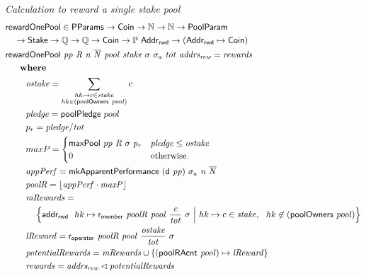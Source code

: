 \begin{figure}[htb]
  \emph{Calculation to reward a single stake pool}
  \begin{align*}
    & \mathsf{rewardOnePool} \in \mathsf{PParams} \to \mathsf{Coin} \to \mathbb{N} \to \mathbb{N} \to \mathsf{PoolParam}\\
      & ~~~\to \mathsf{Stake} \to \mathbb{Q} \to \mathbb{Q} \to \mathsf{Coin} \to \mathbb{P}~\mathsf{Addr_{rwd}}
           \to (\mathsf{Addr_{rwd}} \mapsto \mathsf{Coin}) \\
      & \mathsf{rewardOnePool}~\mathit{pp}~\mathit{R}~\mathit{n}~\mathit{\overline{N}}~\mathit{pool}~\mathit{stake}~{\sigma}~{\sigma_a}~\mathit{tot}~\mathit{addrs_{rew}} =
          \mathit{rewards}\\
      & ~~~~ ~ \mathbf{where}~ ~  \\
      & ~~~~~~~\mathit{ostake} = \sum_{\substack{
        hk_\mapsto c\in\mathit{stake}\\
        hk\in(\mathsf{poolOwners}~\mathit{pool})\\
        }} c \\
      & ~~~~~~~\mathit{pledge} = \mathsf{poolPledge}~pool \\
      & ~~~~~~~p_{r} = \mathit{pledge} / \mathit{tot} \\
      & ~~~~~~~maxP =
      \begin{cases}
        \mathsf{maxPool}~\mathit{pp}~\mathit{R}~\sigma~\mathit{p_r}&
        \mathit{pledge} \leq \mathit{ostake}\\
        0 & \text{otherwise.}
      \end{cases} \\
      & ~~~~~~~\mathit{appPerf} = \mathsf{mkApparentPerformance}~\mathit{(\mathsf{d}~pp)}~{\sigma_a}~\mathit{n}~\mathit{\overline{N}} \\
      & ~~~~~~~\mathit{poolR} = \lfloor\mathit{appPerf}\cdot\mathit{maxP}\rfloor \\
      & ~~~~~~~\mathit{mRewards} = \\
      & ~~~~~~~~~~\left\{
                    \mathsf{addr_{rwd}}~ \mathit{~}hk\mapsto\mathsf{r_{member}}~ \mathit{poolR}~ \mathit{pool}~ \mathit{\frac{c}{tot}}~ {\sigma}
                    ~\Big\vert~
                    hk\mapsto c\in\mathit{stake},~~hk \not\in(\mathsf{poolOwners}~\mathit{pool})
                  \right\}\\
      & ~~~~~~~\mathit{lReward} = \mathsf{r_{operator}}~ \mathit{poolR}~ \mathit{pool}~ \mathit{\frac{\mathit{ostake}}{tot}}~ {\sigma} \\
      & ~~~~~~~\mathit{potentialRewards} =
                 \mathit{mRewards} \cup
                 \{(\mathsf{poolRAcnt}~\mathit{pool})\mapsto\mathit{lReward}\} \\
      & ~~~~~~~\mathit{rewards} = \mathit{addrs_{rew}}\lhd{\ensuremath{\mathit{potentialRewards}}} \\
  \end{align*}


\end{figure}
